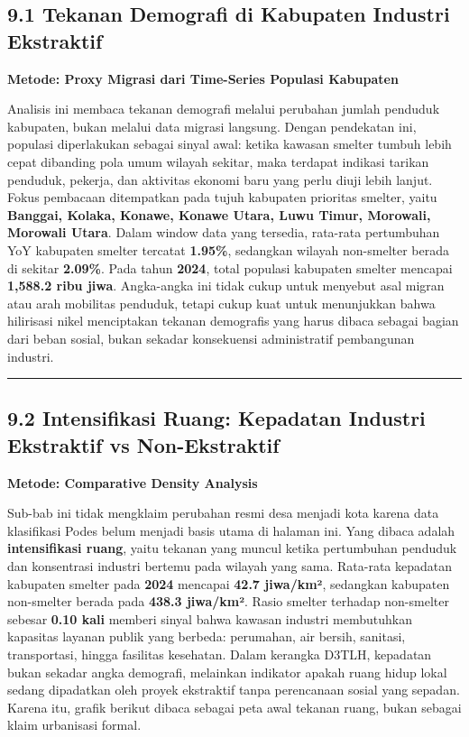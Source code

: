 \documentclass[
]{article}
\begin{document}
\subsection{9.1 Tekanan Demografi di Kabupaten Industri
Ekstraktif}\label{tekanan-demografi-di-kabupaten-industri-ekstraktif}

\textbf{Metode: Proxy Migrasi dari Time-Series Populasi Kabupaten}

Analisis ini membaca tekanan demografi melalui perubahan jumlah penduduk
kabupaten, bukan melalui data migrasi langsung. Dengan pendekatan ini,
populasi diperlakukan sebagai sinyal awal: ketika kawasan smelter tumbuh
lebih cepat dibanding pola umum wilayah sekitar, maka terdapat indikasi
tarikan penduduk, pekerja, dan aktivitas ekonomi baru yang perlu diuji
lebih lanjut. Fokus pembacaan ditempatkan pada tujuh kabupaten prioritas
smelter, yaitu \textbf{Banggai, Kolaka, Konawe, Konawe Utara, Luwu
Timur, Morowali, Morowali Utara}. Dalam window data yang tersedia,
rata-rata pertumbuhan YoY kabupaten smelter tercatat \textbf{1.95\%},
sedangkan wilayah non-smelter berada di sekitar \textbf{2.09\%}. Pada
tahun \textbf{2024}, total populasi kabupaten smelter mencapai
\textbf{1,588.2 ribu jiwa}. Angka-angka ini tidak cukup untuk menyebut
asal migran atau arah mobilitas penduduk, tetapi cukup kuat untuk
menunjukkan bahwa hilirisasi nikel menciptakan tekanan demografis yang
harus dibaca sebagai bagian dari beban sosial, bukan sekadar konsekuensi
administratif pembangunan industri.

\begin{center}\rule{0.5\linewidth}{0.5pt}\end{center}

\subsection{9.2 Intensifikasi Ruang: Kepadatan Industri Ekstraktif vs
Non-Ekstraktif}\label{intensifikasi-ruang-kepadatan-industri-ekstraktif-vs-non-ekstraktif}

\textbf{Metode: Comparative Density Analysis}

Sub-bab ini tidak mengklaim perubahan resmi desa menjadi kota karena
data klasifikasi Podes belum menjadi basis utama di halaman ini. Yang
dibaca adalah \textbf{intensifikasi ruang}, yaitu tekanan yang muncul
ketika pertumbuhan penduduk dan konsentrasi industri bertemu pada
wilayah yang sama. Rata-rata kepadatan kabupaten smelter pada
\textbf{2024} mencapai \textbf{42.7 jiwa/km²}, sedangkan kabupaten
non-smelter berada pada \textbf{438.3 jiwa/km²}. Rasio smelter terhadap
non-smelter sebesar \textbf{0.10 kali} memberi sinyal bahwa kawasan
industri membutuhkan kapasitas layanan publik yang berbeda: perumahan,
air bersih, sanitasi, transportasi, hingga fasilitas kesehatan. Dalam
kerangka D3TLH, kepadatan bukan sekadar angka demografi, melainkan
indikator apakah ruang hidup lokal sedang dipadatkan oleh proyek
ekstraktif tanpa perencanaan sosial yang sepadan. Karena itu, grafik
berikut dibaca sebagai peta awal tekanan ruang, bukan sebagai klaim
urbanisasi formal.
\end{document}
